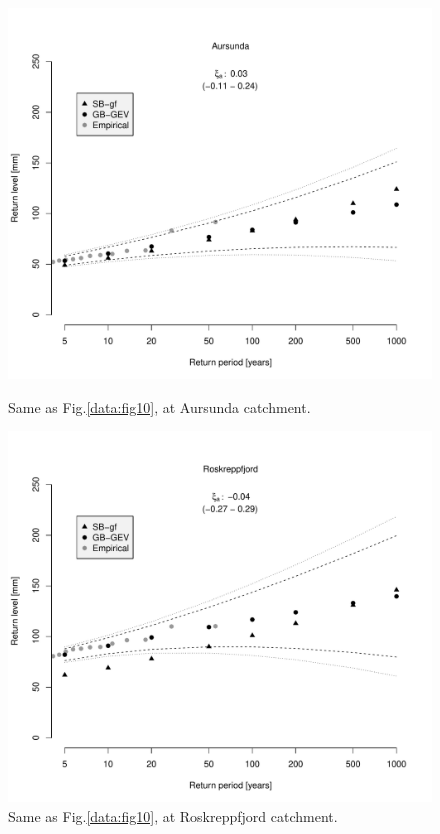 \documentclass[12pt,a4paper,english]{article}
\begin{document}
\begin{figure}[!htbp]
\begin{minipage}[t]{0.50\textwidth}
\centering
\includegraphics[width = \linewidth]{Figs/compareMT_Aursunda.pdf}
\caption[]{\label{data:fig13}Same as Fig.\ref{data:fig10}, at Aursunda catchment.}
\end{minipage}
\hspace{10mm}
\begin{minipage}[t]{0.50\textwidth}
\centering
\includegraphics[width = \linewidth]{Figs/compareMT_Roskreppfjord.pdf}
\caption[]{\label{data:fig14}Same as Fig.\ref{data:fig10}, at Roskreppfjord catchment.}
\end{minipage}
\end{figure}
\end{document}
